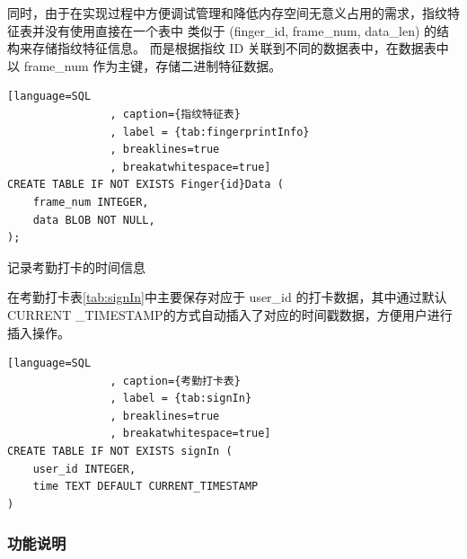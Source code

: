\begin{description}
            同时，由于在实现过程中方便调试管理和降低内存空间无意义占用的需求，指纹特征表并没有使用直接在一个表中
            类似于 (finger\_id, frame\_num, data\_len) 的结构来存储指纹特征信息。
            而是根据指纹 ID 关联到不同的数据表中，在数据表中以 frame\_num 作为主键，存储二进制特征数据。
        
            \begin{lstlisting}[language=SQL
                , caption={指纹特征表}
                , label = {tab:fingerprintInfo}
                , breaklines=true
                , breakatwhitespace=true]
CREATE TABLE IF NOT EXISTS Finger{id}Data (
    frame_num INTEGER,
    data BLOB NOT NULL,
);
            \end{lstlisting}          


        \item[考勤打卡表] 记录考勤打卡的时间信息
        
            在考勤打卡表\ref{tab:signIn}中主要保存对应于 user\_id 的打卡数据，其中通过默认CURRENT
            \_TIMESTAMP的方式自动插入了对应的时间戳数据，方便用户进行插入操作。

            \begin{lstlisting}[language=SQL
                , caption={考勤打卡表}
                , label = {tab:signIn}
                , breaklines=true
                , breakatwhitespace=true]
CREATE TABLE IF NOT EXISTS signIn (
    user_id INTEGER,
    time TEXT DEFAULT CURRENT_TIMESTAMP
)
            \end{lstlisting}    

    \end{description}

    \subsubsection{功能说明}

